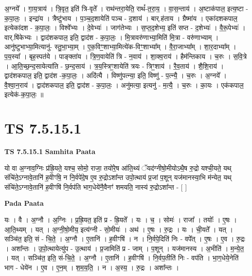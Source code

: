 \documentclass[17pt]{extarticle}
\begin{document}
अ॒ग्नये᳚ । गा॒य॒त्राय॑ । त्रि॒वृत॒ इति॑ त्रि-वृते᳚ । राथ॑न्तरा॒येति॒ राथं᳚-त॒रा॒य॒ । वा॒स॒न्ताय॑ । अ॒ष्टाक॑पाल॒ इत्य॒ष्टा - क॒पा॒लः॒ । इन्द्रा॑य । त्रैष्टु॑भाय । प॒ञ्च॒द॒शायेति॑ पञ्च - द॒शाय॑ । बार्.ह॑ताय । ग्रैष्मा॑य । एका॑दशकपाल॒ इत्येका॑दश - क॒पा॒लः॒ । विश्वे᳚भ्यः । दे॒वेभ्यः॑ । जाग॑तेभ्यः । स॒प्त॒द॒शेभ्य॒ इति॑ सप्त - द॒शेभ्यः॑ । वै॒रू॒पेभ्यः॑ । वार्.षि॑केभ्यः । द्वाद॑शकपाल॒ इति॒ द्वाद॑श - क॒पा॒लः॒ । मि॒त्रावरु॑णाभ्या॒मिति॑ मि॒त्रा - वरु॑णाभ्याम् । आनु॑ष्टुभाभ्या॒मित्यानु॑- स्तु॒भा॒भ्या॒म् । ए॒क॒विꣳ॒॒शाभ्या॒मित्ये॑क-विꣳ॒॒शाभ्या᳚म् । वै॒रा॒जाभ्या᳚म् । शा॒र॒दाभ्या᳚म् । प॒य॒स्या᳚ । बृह॒स्पत॑ये । पाङ्क्ता॑य । त्रि॒ण॒वायेति॑ त्रि - न॒वाय॑ । शा॒क्व॒राय॑ । हैम॑न्तिकाय । च॒रुः । स॒वि॒त्रे । आ॒ति॒च्छ॒न्द॒सायेत्या॑ति - छ॒न्द॒साय॑ । त्र॒य॒स्त्रिꣳ॒॒शायेति॑ त्रयः - त्रिꣳ॒॒शाय॑ । रै॒व॒ताय॑ । शै॒शि॒राय॑ । द्वाद॑शकपाल॒ इति॒ द्वाद॑श -क॒पा॒लः॒ । अदि॑त्यै । विष्णु॑पत्न्या॒ इति॒ विष्णु॑ - प॒त्न्यै॒ । च॒रुः । अ॒ग्नये᳚ । वै॒श्वा॒न॒राय॑ । द्वाद॑शकपाल॒ इति॒ द्वाद॑श - क॒पा॒लः॒ । अनु॑मत्या॒ इत्यनु॑ - म॒त्यै॒ । च॒रुः । का॒यः । एक॑कपाल॒ इत्येक॑-क॒पा॒लः॒ ॥  \newline




\section*{ TS 7.5.15.1 }

\textbf{TS 7.5.15.1 } \newline
\textbf{Samhita Paata} \newline

यो वा अ॒ग्नाव॒ग्निः प्र॑ह्रि॒यते॒ यश्च॒ सोमो॒ राजा॒ तयो॑रे॒ष आ॑ति॒थ्यं ॅयद॑ग्नीषो॒मीयोऽथै॒ष रु॒द्रो यश्ची॒यते॒ यथ् संचि॑ते॒ऽग्नावे॒तानि॑ ह॒वीꣳषि॒ न नि॒र्वपे॑दे॒ष ए॒व रु॒द्रोऽशा᳚न्त उपो॒त्थाय॑ प्र॒जां प॒शून् यज॑मानस्या॒भि म॑न्येत॒ यथ् संचि॑ते॒ऽग्नावे॒तानि॑ ह॒वीꣳषि॑ नि॒र्वप॑ति भाग॒धेये॑नै॒वैनꣳ॑ शमयति॒ नास्य॑ रु॒द्रोऽशा᳚न्त - [  ] \newline

\textbf{Pada Paata} \newline

यः । वै । अ॒ग्नौ । अ॒ग्निः । प्र॒ह्रि॒यत॒ इति॑ प्र - ह्रि॒यते᳚ । यः । च॒ । सोमः॑ । राजा᳚ । तयोः᳚ । ए॒षः । आ॒ति॒थ्यम् । यत् । अ॒ग्नी॒षो॒मीय॒ इत्य॑ग्नी - सो॒मीयः॑ । अथ॑ । ए॒षः । रु॒द्रः । यः । ची॒यते᳚ । यत् । सञ्चि॑त॒ इति॒ सं - चि॒ते॒ । अ॒ग्नौ । ए॒तानि॑ । ह॒वीꣳषि॑ । न । नि॒र्वपे॒दिति॑ निः - वपे᳚त् । ए॒षः । ए॒व । रु॒द्रः । अशा᳚न्तः । उ॒पो॒त्थायेत्यु॑प - उ॒त्थाय॑ । प्र॒जामिति॑ प्र - जाम् । प॒शून् । यज॑मानस्य । अ॒भीति॑ । म॒न्ये॒त॒ । यत् । सञ्चि॑त॒ इति॒ सं-चि॒ते॒ । अ॒ग्नौ । ए॒तानि॑ । ह॒वीꣳषि॑ । नि॒र्वप॒तीति॑ निः - वप॑ति । भा॒ग॒धेये॒नेति॑ भाग - धेये॑न । ए॒व । ए॒न॒म् । श॒म॒य॒ति॒ । न । अ॒स्य॒ । रु॒द्रः । अशा᳚न्तः ।  \newline
\end{document}
